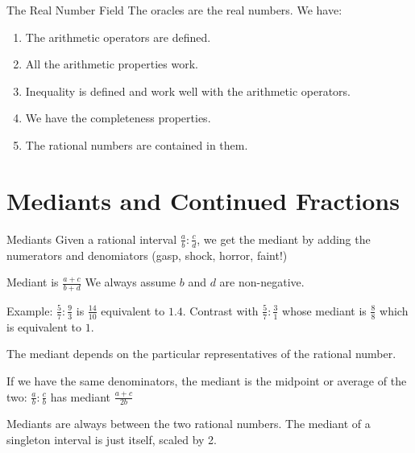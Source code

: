 \documentclass{beamer}
\begin{document}
\begin{frame}{The Real Number Field}
    The oracles are the real numbers. We have:

    \begin{enumerate}
        \item The arithmetic operators are defined.
        \item All the arithmetic properties work.
        \item Inequality is defined and work well with the arithmetic operators.
        \item We have the completeness properties. 
        \item The rational numbers are contained in them. 
    \end{enumerate}
    
\end{frame}

\section{Mediants and Continued Fractions}

\begin{frame}{Mediants}
    Given a rational interval $\frac{a}{b} : \frac{c}{d}$, we get the mediant by adding the numerators and denomiators (gasp, shock, horror, faint!)

    Mediant is $\frac{a+c}{b+d}$  We always assume $b$ and $d$ are non-negative. 

    Example:  $\frac{5}{7}:\frac{9}{3}$ is $\frac{14}{10}$ equivalent to $1.4$. Contrast with $\frac{5}{7}:\frac{3}{1}$ whose mediant is $\frac{8}{8}$ which is equivalent to $1$.

    The mediant depends on the particular representatives of the rational number. 

    If we have the same denominators, the mediant is the midpoint or average of the two: $\frac{a}{b}:\frac{c}{b}$ has mediant $\frac{a+c}{2b}$

    Mediants are always between the two rational numbers. The mediant of a singleton interval is just itself, scaled by 2.  
    
\end{frame}
\end{document}

